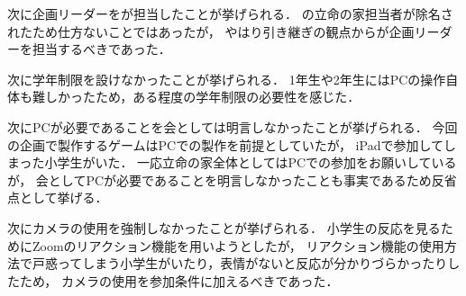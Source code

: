 次に企画リーダーを\thirdGrade{}が担当したことが挙げられる．
\secondGrade{}の立命の家担当者が除名されたため仕方ないことではあったが，
やはり引き継ぎの観点から\secondGrade{}が企画リーダーを担当するべきであった．

次に学年制限を設けなかったことが挙げられる．
1年生や2年生にはPCの操作自体も難しかったため，ある程度の学年制限の必要性を感じた．

次にPCが必要であることを会としては明言しなかったことが挙げられる．
今回の企画で製作するゲームはPCでの製作を前提としていたが，
iPadで参加してしまった小学生がいた．
一応立命の家全体としてはPCでの参加をお願いしているが，
会としてPCが必要であることを明言しなかったことも事実であるため反省点として挙げる．

次にカメラの使用を強制しなかったことが挙げられる．
小学生の反応を見るためにZoomのリアクション機能を用いようとしたが，
リアクション機能の使用方法で戸惑ってしまう小学生がいたり，表情がないと反応が分かりづらかったりしたため，
カメラの使用を参加条件に加えるべきであった．
